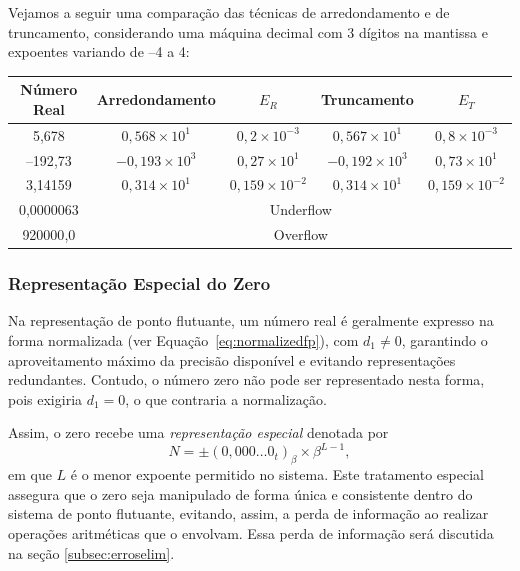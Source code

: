 Vejamos a seguir uma comparação das técnicas de arredondamento e de
truncamento, considerando uma máquina decimal com 3 dígitos na mantissa e
expoentes variando de –4 a 4:
\begin{center}
  \small
  \begin{tabular}{|c|c|c|c|c|}
    \hline
    \textbf{Número Real} & \textbf{Arredondamento}        & \textbf{\(E_R\)}             & \textbf{Truncamento}       & \textbf{\(E_T\)}             \\
    \hline
    5{,}678              & \( 0{,}568 \times 10^1 \)      & \( 0{,}2 \times 10^{-3} \)   & \( 0{,}567 \times 10^1 \)  & \( 0{,}8 \times 10^{-3} \)   \\
    \hline
    –192{,}73            & \( -0{,}193 \times 10^3 \)     & \( 0{,}27 \times 10^{1} \)   & \( -0{,}192 \times 10^3 \) & \( 0{,}73 \times 10^{1} \)   \\
    \hline
    3{,}14159            & \( 0{,}314 \times 10^1 \)      & \( 0{,}159 \times 10^{-2} \) & \( 0{,}314 \times 10^1 \)  & \( 0{,}159 \times 10^{-2} \) \\
    \hline
    0{,}0000063          & \multicolumn{4}{c|}{Underflow}                                                                                            \\
    \hline
    920000{,}0           & \multicolumn{4}{c|}{Overflow}                                                                                             \\
    \hline
  \end{tabular}
\end{center}

\subsubsection{Representação Especial do Zero}

Na representação de ponto flutuante, um número real é geralmente expresso na
forma normalizada (ver Equação~\ref{eq:normalizedfp}), com \( d_1 \neq 0 \),
garantindo o aproveitamento máximo da precisão disponível e evitando
representações redundantes. Contudo, o número zero não pode ser representado
nesta forma, pois exigiria \( d_1 = 0 \), o que contraria a normalização.

Assim, o zero recebe uma \textit{representação especial} denotada por
\begin{equation}
  N = \pm (0{,}000\ldots 0_{t})_\beta \times \beta^{L - 1},
\end{equation}
em que \( L \) é o menor expoente permitido no sistema. Este tratamento
especial assegura que o zero seja manipulado de forma única e consistente
dentro do sistema de ponto flutuante, evitando, assim, a perda de informação ao
realizar operações aritméticas que o envolvam. Essa perda de informação será
discutida na seção \ref{subsec:erroselim}.


